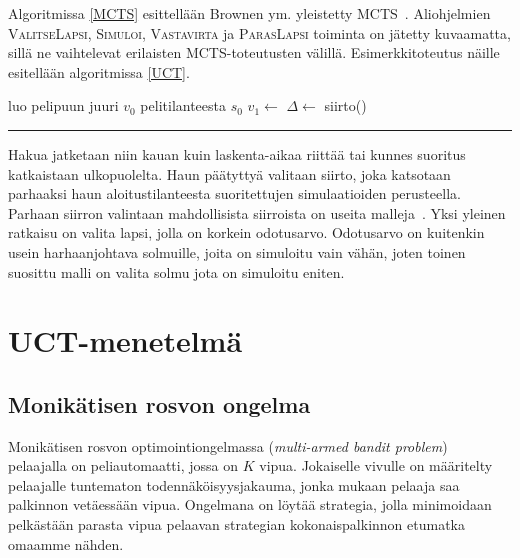 \documentclass[12pt,finnish]{tktltiki2}
\theoremstyle{definition}
\theoremstyle{remark}
\begin{document}
Algoritmissa \ref{MCTS} esittellään Brownen ym. yleistetty MCTS~\cite{browne}. Aliohjelmien \textsc{ValitseLapsi}, \textsc{Simuloi}, \textsc{Vastavirta} ja \textsc{ParasLapsi} toiminta on jätetty kuvaamatta, sillä ne vaihtelevat erilaisten MCTS-toteutusten välillä. Esimerkkitoteutus näille esitellään algoritmissa \ref{UCT}.
\begin{samepage}
\begin{center}
\label{MCTS}
\begin{algorithmic}[0]
	\State luo pelipuun juuri $v_0$ pelitilanteesta $s_0$
		\State $v_1 \leftarrow$ 
		\State $\Delta \leftarrow$ 
		\State {}
	\EndWhile
	\State \Return siirto()
\EndFunction
\end{algorithmic}
\rule{\textwidth}{1pt}
\end{center}
\end{samepage}

Hakua jatketaan niin kauan kuin laskenta-aikaa riittää tai kunnes suoritus katkaistaan ulkopuolelta. Haun päätyttyä valitaan siirto, joka katsotaan parhaaksi haun aloitustilanteesta suoritettujen simulaatioiden perusteella. Parhaan siirron valintaan mahdollisista siirroista on useita malleja~\cite{browne}. Yksi yleinen ratkaisu on valita lapsi, jolla on korkein odotusarvo. Odotusarvo on kuitenkin usein harhaanjohtava solmuille, joita on simuloitu vain vähän, joten toinen suosittu malli on valita solmu jota on simuloitu eniten.

\section{UCT-menetelmä}

\subsection{Monikätisen rosvon ongelma}

Monikätisen rosvon optimointiongelmassa (\textit{multi-armed bandit problem})~\cite{browne} pelaajalla on peliautomaatti, jossa on $K$ vipua. Jokaiselle vivulle on määritelty pelaajalle tuntematon todennäköisyysjakauma, jonka mukaan pelaaja saa palkinnon vetäessään vipua. Ongelmana on löytää strategia, jolla minimoidaan pelkästään parasta vipua pelaavan strategian kokonaispalkinnon etumatka omaamme nähden.
\end{document}
